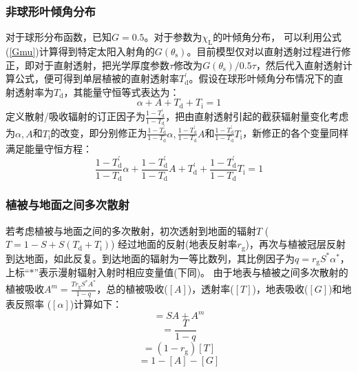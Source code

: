 \subsubsection{非球形叶倾角分布}

对于球形分布函数，已知$G=0.5$。对于参数为$\chi_{\mathrm {L}}$的叶倾角分布，
可以利用公式(\ref{Gmu})计算得到特定太阳入射角的$G\left(\theta_{\mathrm s}\right)$。目前模型仅对以直射透射过程进行修正，即对于直射透射，把光学厚度参数$\tau$修改为$G\left(\theta_{\mathrm s}\right)/0.5\tau$，然后代入直射透射计算公式，便可得到单层植被的直射透射率$T_{\mathrm d}^\prime$。假设在球形叶倾角分布情况下的直射透射率为$T_{\mathrm d}$，其能量守恒等式表达为：
\begin{equation}
  \alpha+A+T_{\mathrm{d}}+T_{\mathrm{i}}=1
\end{equation}
%
定义散射/吸收辐射的订正因子为$\frac{1-T_{\mathrm d}^\prime}{1-T_{\mathrm d}}$，把由直射透射引起的截获辐射量变化考虑为$\alpha, A$和$T_{\mathrm i}$的改变，即分别修正为$\frac{1-T_{\mathrm d}^\prime}{1-T_{\mathrm d}}\alpha, \frac{1-T_{\mathrm d}^\prime}{1-T_{\mathrm d}}A$和$\frac{1-T_{\mathrm d}^\prime}{1-T_{\mathrm d}}T_{\mathrm i}$，新修正的各个变量同样满足能量守恒方程：
\begin{equation}
  \frac{1-T_{\mathrm{d}}^{\prime}}{1-T_{\mathrm{d}}} \alpha+\frac{1-T_{\mathrm{d}}^{\prime}}{1-T_{\mathrm{d}}} A+T_{\mathrm{d}}^{\prime}+\frac{1-T_{\mathrm{d}}^{\prime}}{1-T_{\mathrm{d}}} T_{\mathrm{i}}=1
\end{equation}

\subsubsection{植被与地面之间多次散射}
若考虑植被与地面之间的多次散射，初次透射到地面的辐射$T$ ($T=1-S+S\left(T_{\mathrm d}+T_{\mathrm i}\right)$) 经过地面的反射(地表反射率$r_{\mathrm {g}}$)，再次与植被冠层反射到达地面，如此反复。到达地面的辐射为一等比数列，其比例因子为$q=r_{\mathrm {g}}S^\ast\alpha^\ast$，上标“$\ast$”表示漫射辐射入射时相应变量值(下同)。
由于地表与植被之间多次散射的植被吸收$A^m=\frac{Tr_{\mathrm {g}}S^\ast A^\ast}{1-q}$，总的植被吸收($\left[A\right]$)，透射率($\left[T\right]$)，地表吸收($\left[G\right]$)和地表反照率 ($\left[\alpha\right]$)计算如下：
\begin{equation}
  [A]=S A+A^{m}
\end{equation}
\begin{equation}
  [T]=\frac{T}{1-q}
\end{equation}
\begin{equation}
  [G]=\left(1-r_{\mathrm{g}}\right)[T]
\end{equation}
\begin{equation}
  [\alpha]=1-[A]-[G]
\end{equation}


